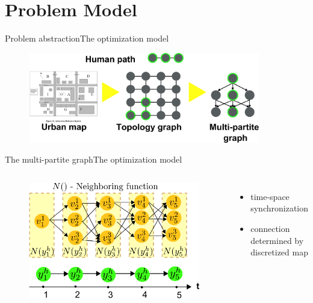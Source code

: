\section{Problem Model}

\begin{frame}{Problem abstraction}{The optimization model}

\begin{figure}
\centering
\includegraphics[width = 0.9\textwidth]{./figure/layers}
\end{figure}

\end{frame}

\begin{frame}{The multi-partite graph}{The optimization model}

\begin{columns}

\begin{minipage}[c]{\textwidth}
\begin{figure}
\centering
\includegraphics[width = \textwidth]{./figure/MultiPartite}
\end{figure}
\end{minipage}

\begin{minipage}[c]{\textwidth}
\begin{itemize}
\item time-space synchronization
\item connection determined by discretized map
\end{itemize}
\end{minipage}

\end{columns}

\end{frame}

